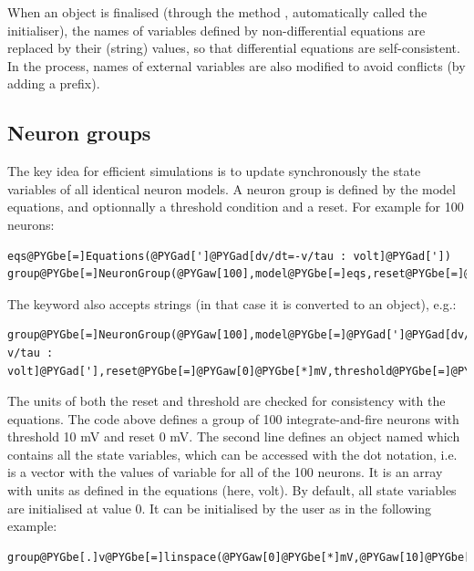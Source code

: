 \documentclass[letterpaper,10pt]{manual}
\begin{document}
When an \hyperlink{brian.Equations}{} object is finalised (through the method ,
automatically called the \hyperlink{brian.NeuronGroup}{} initialiser), the names of variables defined by
non-differential equations are replaced by their (string) values, so that differential equations
are self-consistent. In the process, names of external variables are also modified to avoid
conflicts (by adding a prefix).


\subsection{Neuron groups}

The key idea for efficient simulations is to update synchronously the state variables
of all identical neuron models. A neuron group is defined by the model equations, and
optionnally a threshold condition and a reset. For example for 100 neurons:

\begin{Verbatim}[commandchars=@\[\]]
eqs@PYGbe[=]Equations(@PYGad[']@PYGad[dv/dt=-v/tau : volt]@PYGad['])
group@PYGbe[=]NeuronGroup(@PYGaw[100],model@PYGbe[=]eqs,reset@PYGbe[=]@PYGaw[0]@PYGbe[*]mV,threshold@PYGbe[=]@PYGaw[10]@PYGbe[*]mV)
\end{Verbatim}

The  keyword also accepts strings (in that case it is converted to an \hyperlink{brian.Equations}{}
object), e.g.:

\begin{Verbatim}[commandchars=@\[\]]
group@PYGbe[=]NeuronGroup(@PYGaw[100],model@PYGbe[=]@PYGad[']@PYGad[dv/dt=-v/tau : volt]@PYGad['],reset@PYGbe[=]@PYGaw[0]@PYGbe[*]mV,threshold@PYGbe[=]@PYGaw[10]@PYGbe[*]mV)
\end{Verbatim}

The units of both the reset and threshold are checked for consistency with the equations.
The code above defines a group of 100 integrate-and-fire neurons with threshold 10 mV and
reset 0 mV. The second line defines an object named  which contains all the state
variables, which can be accessed with the dot notation, i.e.  is a vector with
the values of variable  for all of the 100 neurons. It is an array with units as defined
in the equations (here, volt). By default, all state variables are initialised at value 0.
It can be initialised by the user as in the following example:

\begin{Verbatim}[commandchars=@\[\]]
group@PYGbe[.]v@PYGbe[=]linspace(@PYGaw[0]@PYGbe[*]mV,@PYGaw[10]@PYGbe[*]mV,@PYGaw[100])
\end{Verbatim}
\end{document}
